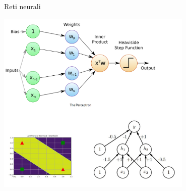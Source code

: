 \documentclass[11pt]{beamer}
\begin{document}
\begin{frame}{Reti neurali \cite{pml1Book,pml2Book}}
\begin{center}
\includegraphics[width=0.7\textwidth]{Pic/perceptron.png}
\end{center}
\end{frame}
\end{document}
